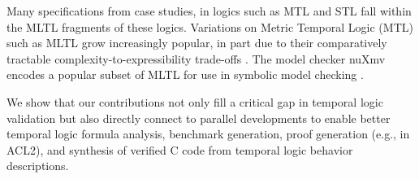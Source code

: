 \documentclass[runningheads]{llncs}
\begin{document}
Many specifications from case studies, in logics such as MTL \cite{AH90} and STL \cite{MN04} fall within the MLTL fragments of these logics. 
Variations on Metric Temporal Logic (MTL) such as MLTL grow increasingly popular, in part due to their comparatively tractable complexity-to-expressibility trade-offs \cite{OW08}.
The model checker {\sf nuXmv} encodes a popular subset of MLTL for use in symbolic model checking \cite{nuXmv-v1.1.0}.%

We show that our contributions not only fill a critical gap in temporal logic validation but also directly connect to parallel developments to enable better temporal logic formula analysis, benchmark generation, proof generation (e.g., in ACL2), and synthesis of verified C code from temporal logic behavior descriptions. 


\end{document}
